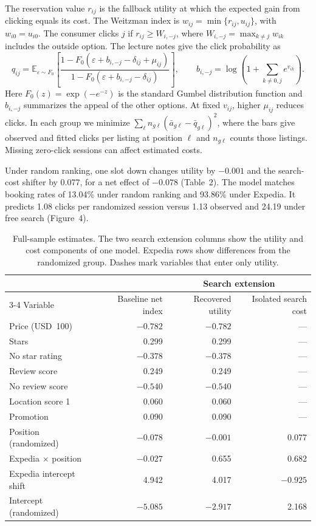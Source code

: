 \documentclass[a4paper,12pt]{article}
\begin{document}
The reservation value $r_{ij}$ is the fallback utility at which the expected gain from clicking equals its cost. The Weitzman index is $w_{ij}=\min\{r_{ij},u_{ij}\}$, with $w_{i0}=u_{i0}$. The consumer clicks $j$ if $r_{ij}\geq W_{i,-j}$, where $W_{i,-j}=\max_{k\ne j} w_{ik}$ includes the outside option. The lecture notes give the click probability as
\[
 q_{ij}=\mathbb E_{\varepsilon\sim F_0}\!\left[\frac{1-F_0(\varepsilon+b_{i,-j}-\delta_{ij}+\mu_{ij})}{1-F_0(\varepsilon+b_{i,-j}-\delta_{ij})}\right],
 \qquad b_{i,-j}=\log\!\left(1+\sum_{k\ne 0,j}e^{v_{ik}}\right).
\]
Here $F_0(z)=\exp(-e^{-z})$ is the standard Gumbel distribution function and $b_{i,-j}$ summarizes the appeal of the other options. At fixed $v_{ij}$, higher $\mu_{ij}$ reduces clicks. In each group we minimize $\sum_\ell n_{g\ell}(\bar a_{g\ell}-\bar q_{g\ell})^2$, where the bars give observed and fitted clicks per listing at position $\ell$ and $n_{g\ell}$ counts those listings. Missing zero-click sessions can affect estimated costs.

\newpage
Under random ranking, one slot down changes utility by $-0.001$ and the search-cost shifter by 0.077, for a net effect of $-0.078$ (Table~2). The model matches booking rates of 13.04\% under random ranking and 93.86\% under Expedia. It predicts 1.08 clicks per randomized session versus 1.13 observed and 24.19 under free search (Figure~4).

\begin{table}[H]
\centering
\caption{Full-sample estimates. The two search extension columns show the utility and cost components of one model. Expedia rows show differences from the randomized group. Dashes mark variables that enter only utility.}
\small
\setlength{\tabcolsep}{4pt}
\begin{tabular}{lrrr}
\toprule
 & & \multicolumn{2}{c}{Search extension}\\
\cmidrule(lr){3-4}
Variable & Baseline net index & Recovered utility & Isolated search cost\\
\midrule
Price (USD~100) & $-0.782$ & $-0.782$ & ---\\
Stars & 0.299 & 0.299 & ---\\
No star rating & $-0.378$ & $-0.378$ & ---\\
Review score & 0.249 & 0.249 & ---\\
No review score & $-0.540$ & $-0.540$ & ---\\
Location score 1 & 0.060 & 0.060 & ---\\
Promotion & 0.090 & 0.090 & ---\\
Position (randomized) & $-0.078$ & $-0.001$ & 0.077\\
Expedia $\times$ position & $-0.027$ & 0.655 & 0.682\\
Expedia intercept shift & 4.942 & 4.017 & $-0.925$\\
Intercept (randomized) & $-5.085$ & $-2.917$ & 2.168\\
\bottomrule
\end{tabular}
\end{table}
\end{document}
